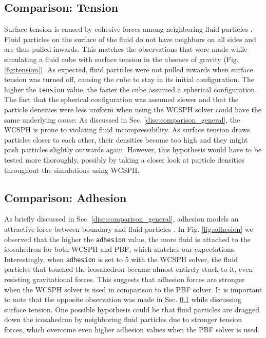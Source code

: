 \documentclass[11pt, letterpaper, twocolumn]{article}
\begin{document}
\subsection{Comparison: Tension}
\label{disc:comparison_tension}
Surface tension is caused by cohesive forces among neighboring fluid particles \cite{akinci2013}. Fluid particles on the surface of the fluid do not have neighbors on all sides and are thus pulled inwards. This matches the observations that were made while simulating a fluid cube with surface tension in the absence of gravity (Fig. \ref{fig:tension}).
As expected, fluid particles were not pulled inwards when surface tension was turned off, causing the cube to stay in its initial configuration. The higher the \texttt{tension} value, the faster the cube assumed a spherical configuration. The fact that the spherical configuration was assumed slower and that the particle densities were less uniform
when using the WCSPH solver could have the same underlying cause: As discussed in Sec. \ref{disc:comparison_general}, the WCSPH is prone to violating fluid incompressibility. As surface tension draws particles closer to each other, their densities become too high and they might push particles slightly outwards again. However, this hypothesis would 
have to be tested more thoroughly, possibly by taking a closer look at particle densities throughout the simulations using WCSPH. 

\subsection{Comparison: Adhesion}
As briefly discussed in Sec. \ref{disc:comparison_general}, adhesion models an attractive force between boundary and fluid particles \cite{akinci2013}. In Fig. \ref{fig:adhesion} we observed that the higher the \texttt{adhesion} value, the more fluid is attached to the icosahedron for both WCSPH and PBF, which matches our expectations. 
Interestingly, when \texttt{adhesion} is set to 5 with the WCSPH solver, the fluid particles that touched the icosahedron became almost entirely stuck to it, even resisting gravitational forces. This suggests that adhesion forces are stronger when the WCSPH solver is used in comparison to the PBF solver. It is important to note that the opposite observation
was made in Sec. \ref{disc:comparison_tension} while discussing surface tension. One possible hypothesis could be that fluid particles are dragged down the icosahedron by neighboring fluid particles due to stronger tension forces, which overcome even higher adhesion values when the PBF solver is used. 
\end{document}
